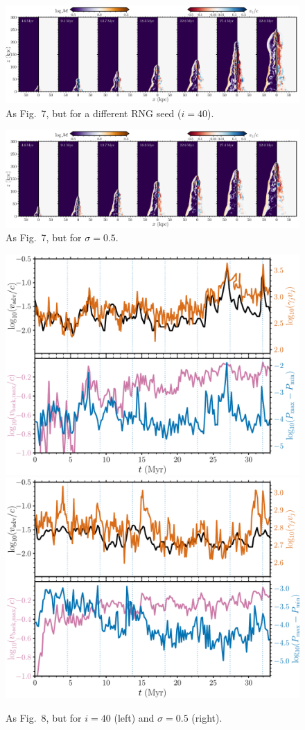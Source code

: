 \documentclass[fleqn,usenatbib,twocolumn]{mnras}
\begin{document}
\begin{figure}
    \centering
    \includegraphics[width=0.97\linewidth]{ColorMeshTime_40.png}
    \caption{
    As Fig.~7, but for a different RNG seed ($i=40$).
    }
    \label{fig:ColorMeshTime_40}
\end{figure}

\begin{figure}
    \centering
    \includegraphics[width=0.97\linewidth]{ColorMeshTime_sig05.png}
    \caption{
    As Fig.~7, but for $\sigma=0.5$.
    }
    \label{fig:ColorMeshTime_05}
\end{figure}

\begin{figure}
    \centering
    \includegraphics[width=0.48\linewidth]{advance_with_backflow_sig1.5_seed40.pdf}
    \includegraphics[width=0.48\linewidth]{advance_with_backflow_sig0.5_seed43.pdf}
    \caption{
    As Fig.~8, but for $i=40$ (left) and $\sigma=0.5$ (right).
    }
    \label{fig:backflow_other_seeds}
\end{figure}

\bsp    %
\label{lastpage}
\end{document}
